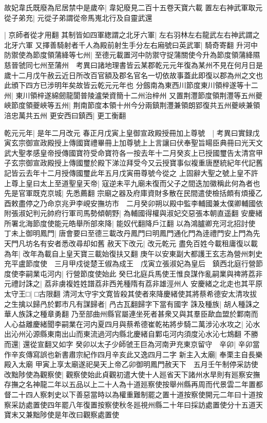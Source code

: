 故妃韋氏既廢為尼居禁中是歲卒|{
	韋妃廢見二百十五卷天寶六載}
置左右神武軍取元從子弟充|{
	元從子弟謂從帝馬嵬北行及自靈武還}


|{
	京師者從才用翻}
其制皆如四軍緫謂之北牙六軍|{
	左右羽林左右龍武左右神武謂之北牙六軍}
又擇善騎射者千人為殿前射生手分左右廂號曰英武軍|{
	騎奇寄翻}
升河中防禦使為節度領蒲絳等七州|{
	至德元載置河中防禦守捉蒲關使今升為節度領蒲絳隰慈晉虢同七州至蒲州　考異曰諸地理書皆云某郡乾元元年復為某州不見在何月日是歲十二月戊午赦云近日所改百官額及郡名官名一切依故事蓋此即復以郡為州之文也此頒下四方已涉明年矣故皆云乾元元年也}
分劔南為東西川節度東川領梓遂等十二州|{
	東川領梓遂綿劒龍閬普陵瀘榮資簡十二州治梓州}
又置荆灃節度領荆灃等五州夔峽節度領夔峽等五州|{
	荆南節度本領十州今分兩鎮荆灃兼領朗郢復共五州夔峽兼領涪忠萬共五州}
更安西曰鎮西|{
	更工衡翻}


乾元元年|{
	是年二月改元}
春正月戊寅上皇御宣政殿授冊加上尊號　|{
	考異曰實録戊寅玄宗御宣政殿授上傳國寶禮畢冊上加尊號上上言讓曰伏奉聖旨䁑臣典冊曰光天文武大聖孝感皇帝授傳國寶符受命寶符各一按去年十二月癸亥上已授國璽告太清宫甲子玄宗御宣政殿授上傳國璽於殿下涕泣拜受今又云授寶事似複重唐歷統紀年代記舊記皆云去年十二月授傳國璽此年五月戊寅冊尊號今從之}
上固辭大聖之號上皇不許上尊上皇曰太上至道聖皇天帝|{
	寇逆未平九廟未復而父子之間迭加徽稱此何為者也}
先是官軍既克京城|{
	先悉薦翻}
宗廟之器及府庫資財多散在民間遣使檢括頗有煩擾乙酉敕盡停之乃命京兆尹李峴安撫坊市　二月癸卯朔以殿中監李輔國兼太僕卿輔國依附張淑妃判元帥府行軍司馬勢傾朝野|{
	為輔國得權與淑妃交惡張本朝直遥翻}
安慶緒所署北海節度使能元皓舉所部來降|{
	能奴代翻降戶江翻}
以為鴻臚卿充河北招討使　丁未上御明鳳門|{
	唐會要曰至德三載改丹鳳門曰明鳳門通化門為逹禮門安上門為先天門凡坊名有安者悉改尋却如舊}
赦天下改元|{
	改元乾元}
盡免百姓今載租庸復以載為年|{
	改年為載自上皇天寶三載始復扶又翻}
庚午以安東副大都護王玄志為營州刺史充平盧節度使　三月甲戍徙楚王俶為成王　戊寅立張淑妃為皇后　鎮西北庭行營節度使李嗣業屯河内|{
	行營節度使始此}
癸巳北庭兵馬使王惟良謀作亂嗣業與禆將荔非元禮討誅之|{
	荔非虜複姓姓譜荔非西羌種隋有荔非雄涇州人}
安慶緒之北走也其平原太守王□|{
	□古限翻}
清河太守宇文寛皆殺其使者來降慶緒使其將蔡希德安太清攻拔之生擒以歸冎於鄴市凡有謀歸者|{
	冎古瓦翻歸字下當有國字}
誅及種族|{
	胡人種誅之華人族誅之種章勇翻}
乃至部曲州縣官屬連坐死者甚衆又與其羣臣歃血盟於鄴南而人心益離慶緒聞李嗣業在河内夏四月與蔡希德崔乾祐將步騎二萬涉沁水攻之|{
	沁水出沁州沁源縣東南出山而東流過河内縣北慶緒自鄴屯河内須度沁水沁七鴆翻}
不勝而還|{
	還從宣翻又如字}
癸卯以太子少師虢王巨為河南尹充東京留守　辛卯|{
	辛卯當作辛亥傳寫誤也新書肅宗紀作四月辛亥此又逸四月二字}
新主入太廟|{
	奉栗主自長樂殿入太廟}
甲寅上享太廟遂祀昊天上帝乙卯御明鳳門赦天下　五月壬午制停采訪使改黜陟使為觀察使|{
	觀察使始此貞觀初遣大使十人廵省天下諸州水旱則有廵察安撫存撫之名神龍二年以五品以上二十人為十道廵察使按舉州縣再周而代景雲二年置都督二十四人察刺史以下善惡當時以為權重難制罷之置十道按察使開元二年曰十道按察采訪處置使四年罷八年復置按察使秋冬廵視州縣二十年曰採訪處置使分十五道天寶末又兼黜陟使是年改曰觀察處置使}
